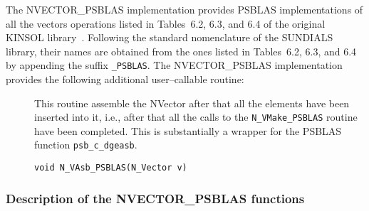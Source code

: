 \documentclass[twoside,a4paper]{refart}
\theoremstyle{definition}
\begin{document}
The NVECTOR\_PSBLAS implementation provides PSBLAS implementations of all the vectors operations listed in Tables~6.2, 6.3, and 6.4 of the original KINSOL library~\cite{kinsolguide}. Following the standard nomenclature of the SUNDIALS library, their names are obtained from the ones listed in Tables~6.2, 6.3, and 6.4 by appending the suffix \texttt{\_PSBLAS}. The NVECTOR\_PSBLAS implementation provides the following additional user--callable routine:

\begin{description}
	\item[] This routine assemble the NVector after that all the elements have been inserted into it, i.e., after that all the calls to the \texttt{N\_VMake\_PSBLAS} routine have been completed. This is substantially a wrapper for the PSBLAS function \lstinline[style=CStyle]|psb_c_dgeasb|.

	 \lstinline[style=CStyle]|void N_VAsb_PSBLAS(N_Vector v)|
\end{description}

\subsubsection{Description of the NVECTOR\_PSBLAS functions}
\end{document}
